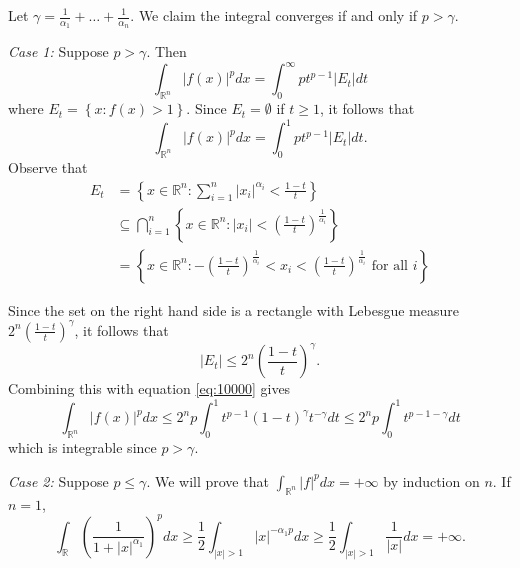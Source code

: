 \documentclass[answers]{exam}
\theoremstyle{problemstyle}
\newcommand{\vt}{\vskip 5mm} %
\newcommand{\1}[1]{\textbf{1}_{\left[#1\right]}} %
\def\R{\mathbb{R}} %
\def\({\left (}
\def\){\right )}
\begin{document}
\begin{questions}
\begin{solution}

Let $\gamma=\frac{1}{\alpha_{1}}+\ldots+\frac{1}{\alpha_{n}}$. We claim the integral converges if and only if $p>\gamma$.

\vt
\textit{Case 1:} Suppose $p>\gamma$. Then
\begin{equation*}
  \int_{\R^{n}} |f(x)|^{p}dx = \int_{0}^{\infty}p t^{p-1}|E_{t}|dt
\end{equation*}
where $E_{t}= \left\{ x: f(x)>1 \right\}$. Since $E_{t}=\emptyset$ if $t\geq 1$, it follows that
\begin{equation}\label{eq:10000}
  \int_{\R^{n}} |f(x)|^{p}dx = \int_{0}^{1}p t^{p-1}|E_{t}|dt.
\end{equation}
Observe that
\begin{align*}
  E_{t}
  &= \left\{ x\in \R^{n} : \sum_{i=1}^{n}|x_{i}|^{\alpha_{i}}< \frac{1-t}{t} \right\} \\
  &\subseteq \bigcap_{i=1}^{n}\left\{ x\in \R^{n}: |x_{i}| < \left(\frac{1-t}{t}\right)^{\frac{1}{\alpha_{i}}} \right\}\\
  &= \left\{ x\in \R^{n}:  -\left(\frac{1-t}{t}\right)^{\frac{1}{\alpha_{i}}} < x_{i}< \left(\frac{1-t}{t}\right)^{\frac{1}{\alpha_{i}}} \text{ for all }i\right\}
\end{align*}

Since the set on the right hand side is a rectangle with Lebesgue measure $2^{n}\left(\frac{1-t}{t}\right)^{\gamma}$, it follows that
\begin{equation*}
  |E_{t}| \leq 2^{n}\left(\frac{1-t}{t}\right)^{\gamma}.
\end{equation*}
Combining this with equation \eqref{eq:10000} gives
\begin{equation*}
  \int_{\R^{n}} |f(x)|^{p}dx \leq 2^{n}p \int_{0}^{1}t^{p-1}(1-t)^{\gamma}t^{-\gamma}dt \leq 2^{n}p \int_{0}^{1}t^{p-1-\gamma}dt
\end{equation*}
which is integrable since $p>\gamma$.


\vt
\textit{Case 2:} Suppose $p\leq\gamma$. We will prove that $\int_{\R^{n}} |f|^{p}dx = +\infty$ by induction on $n$. If $n=1$,
\begin{equation*}
  \int_{\R} \(\frac{1}{1+ |x|^{\alpha_{1}}}\)^{p}dx \geq  \frac{1}{2}\int_{|x|>1} |x|^{-\alpha_{1}p}dx \geq \frac{1}{2}\int_{|x|>1}\frac{1}{|x|}dx= +\infty.
\end{equation*}


\end{solution}
\end{questions}
\end{document}
